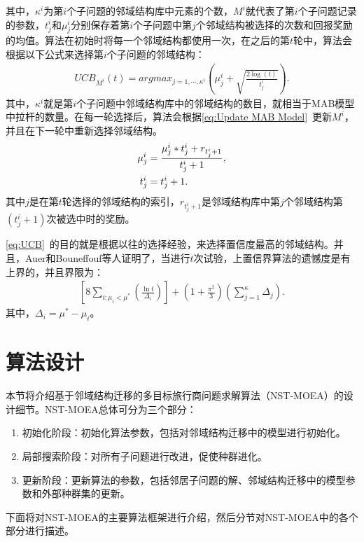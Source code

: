 其中，$\kappa^i$为第$i$个子问题的邻域结构库中元素的个数，$M^i$就代表了第$i$个子问题记录的参数，$t^i_j$和$\mu^i_j$分别保存着第$i$个子问题中第$j$个邻域结构被选择的次数和回报奖励的均值。算法在初始时将每一个邻域结构都使用一次，在之后的第$t$轮中，算法会根据以下公式来选择第$i$个子问题的邻域结构：
\begin{align}
    \label{eq:UCB}
    UCB_{M^i}(t) = argmax_{j=1,\cdots,\kappa^i}(\mu^i_j + \sqrt{\frac{2\log(t)}{t^i_j}}).
\end{align}
其中，$\kappa^i$就是第$i$个子问题中邻域结构库中的邻域结构的数目，就相当于MAB模型中拉杆的数量。在每一轮选择后，算法会根据\autoref{eq:Update MAB Model}~更新$M^i$，并且在下一轮中重新选择邻域结构。
\begin{align} \label{eq:Update MAB Model}
    \mu^i_j &= \frac{\mu^i_j*t^i_j+r_{t^i_j+1}}{t^i_j+1}, \\
    t^i_j &= t^i_j + 1. \notag
\end{align}
其中$j$是在第$t$轮选择的邻域结构的索引，$r_{t^i_j+1}$是邻域结构库中第$j$个邻域结构第$(t^i_j+1)$次被选中时的奖励。
\par
\autoref{eq:UCB}~的目的就是根据以往的选择经验，来选择置信度最高的邻域结构。并且，Auer\cite{auer2002using}和Bouneffouf等人\cite{bouneffouf2016multi}证明了，当进行$t$次试验，上置信界算法的遗憾度是有上界的，并且界限为：
\begin{align}
    \label{eq:Regret Bound}
    [8\sum_{i:\mu_i < \mu^*} (\frac{\ln t}{\Delta_i})] + (1 + \frac{\pi^2}{3})(\sum_{j=1}^{\kappa} \Delta_j).
\end{align}
其中，$\Delta_i = \mu^* - \mu_i$。

\section{算法设计}
\label{sec:NST:算法设计}
本节将介绍基于邻域结构迁移的多目标旅行商问题求解算法（NST-MOEA）的设计细节。NST-MOEA总体可分为三个部分：
\begin{enumerate}
    \item 初始化阶段：初始化算法参数，包括对邻域结构迁移中的模型进行初始化。
    \item 局部搜索阶段：对所有子问题进行改进，促使种群进化。
    \item 更新阶段：更新算法的参数，包括邻居子问题的解、邻域结构迁移中的模型参数和外部种群集的更新。
\end{enumerate}
下面将对NST-MOEA的主要算法框架进行介绍，然后分节对NST-MOEA中的各个部分进行描述。

